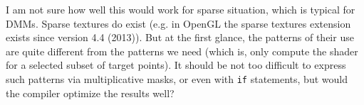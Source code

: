 \documentclass{article}
\begin{document}
\bigskip

I am not sure how well this would work for sparse situation, which is typical for DMMs. Sparse textures do exist (e.g. in OpenGL the sparse textures extension exists since version 4.4 (2013)). But at the first glance, the patterns of their use are quite different from the patterns we need (which is, only compute the shader for a selected subset of target points). It should be
not too difficult to express such patterns via multiplicative masks, or even with {\tt if} statements, but would the compiler optimize the results well?

\theendnotes

\end{document}
